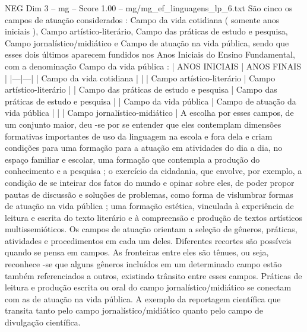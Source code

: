 \begin{textsample}{NEG Dim 3 – mg – Score 1.00 – mg/mg\_ef\_linguagens\_lp\_6.txt}
São cinco os campos de atuação considerados : Campo da vida cotidiana ( somente anos iniciais ), Campo artístico-literário, Campo das práticas de estudo e pesquisa, Campo jornalístico/midiático e Campo de atuação na vida pública, sendo que esses dois últimos aparecem fundidos nos Anos Iniciais do Ensino Fundamental, com a denominação Campo da vida pública : | ANOS INICIAIS | ANOS FINAIS | |---|---| | Campo da vida cotidiana | | | Campo artístico-literário | Campo artístico-literário | | Campo das práticas de estudo e pesquisa | Campo das práticas de estudo e pesquisa | | Campo da vida pública | Campo de atuação da vida pública | | | Campo jornalístico-midiático | A escolha por esses campos, de um conjunto maior, deu -se por se entender que eles contemplam dimensões formativas importantes de uso da linguagem na escola e fora dela e criam condições para uma formação para a atuação em atividades do dia a dia, no espaço familiar e escolar, uma formação que contempla a produção do conhecimento e a pesquisa ; o exercício da cidadania, que envolve, por exemplo, a condição de se inteirar dos fatos do mundo e opinar sobre eles, de poder propor pautas de discussão e soluções de problemas, como forma de vislumbrar formas de atuação na vida pública ; uma formação estética, vinculada à experiência de leitura e escrita do texto literário e à compreensão e produção de textos artísticos multissemióticos.
Os campos de atuação orientam a seleção de gêneros, práticas, atividades e procedimentos em cada um deles.
Diferentes recortes são possíveis quando se pensa em campos.
As fronteiras entre eles são tênues, ou seja, reconhece -se que alguns gêneros incluídos em um determinado campo estão também referenciados a outros, existindo trânsito entre esses campos.
Práticas de leitura e produção escrita ou oral do campo jornalístico/midiático se conectam com as de atuação na vida pública.
A exemplo da reportagem científica que transita tanto pelo campo jornalístico/midiático quanto pelo campo de divulgação científica.

\end{textsample}

